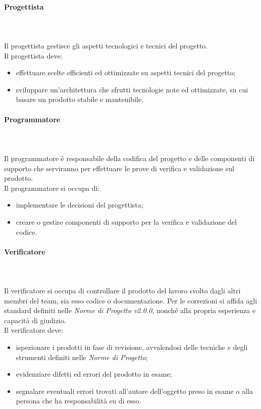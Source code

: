 			\paragraph{Progettista} \mbox{}\\ \mbox{}\\
			Il progettista gestisce gli aspetti tecnologici e tecnici del progetto.\\
			Il progettista deve:
			\begin{itemize}
				\item effettuare scelte efficienti ed ottimizzate su aspetti tecnici del progetto;
				\item sviluppare un'architettura che sfrutti tecnologie note ed ottimizzate, su cui basare un prodotto stabile e mantenibile.
			\end{itemize}
			\paragraph{Programmatore} \mbox{}\\ \mbox{}\\
			Il programmatore è responsabile della codifica del progetto e delle componenti di supporto che serviranno per effettuare le prove di verifica e validazione sul prodotto.\\
			Il programmatore si occupa di:
			\begin{itemize}
				\item implementare le decisioni del progettista;
				\item creare o gestire componenti di supporto per la verifica e validazione del codice.
			\end{itemize}
			\paragraph{Verificatore} \mbox{}\\ \mbox{}\\
			Il verificatore si occupa di controllare il prodotto del lavoro svolto dagli altri membri del team, sia esso codice o documentazione. Per le correzioni si affida agli standard definiti nelle \textit{Norme di Progetto v2.0.0}, nonché alla propria esperienza e capacità di giudizio.\\
			Il verificatore deve:
			\begin{itemize}
				\item ispezionare i prodotti in fase di revisione, avvalendosi delle tecniche e degli strumenti definiti nelle \textit{Norme di Progetto};
				\item evidenziare difetti ed errori del prodotto in esame;
				\item segnalare eventuali errori trovati all'autore dell'oggetto preso in esame o alla persona che ha responsabilità su di esso.
			\end{itemize}
		
